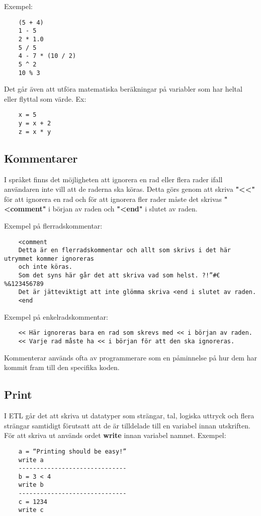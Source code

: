 \documentclass{TDP019mall}
\begin{document}
Exempel:

\begin{verbatim}
    (5 + 4)
    1 - 5
    2 * 1.0
    5 / 5
    4 - 7 * (10 / 2)
    5 ^ 2
    10 % 3
\end{verbatim}

Det går även att utföra matematiska beräkningar på variabler som har heltal eller flyttal som värde. Ex:
\begin{verbatim}
    x = 5
    y = x + 2
    z = x * y
\end{verbatim}

\subsection{Kommentarer}
I språket finns det möjligheten att ignorera en rad eller flera rader ifall användaren inte vill att de raderna ska köras. 
Detta görs genom att skriva \textbf{"<<"} för att ignorera en rad och för att ignorera fler rader måste det skrivas 
\textbf{"<comment"} i början av raden och \textbf{"<end"} i slutet av raden.

Exempel på flerradskommentar:
\begin{verbatim}
    <comment 
    Detta är en flerradskommentar och allt som skrivs i det här utrymmet kommer ignoreras 
    och inte köras. 
    Som det syns här går det att skriva vad som helst. ?!”#€%&123456789
    Det är jätteviktigt att inte glömma skriva <end i slutet av raden.
    <end
\end{verbatim}
 
Exempel på enkelradskommentar:
\begin{verbatim}
    << Här ignoreras bara en rad som skrevs med << i början av raden.
    << Varje rad måste ha << i början för att den ska ignoreras.
\end{verbatim}
 
Kommenterar används ofta av programmerare som en påminnelse på hur dem har kommit fram till den specifika koden.

\subsection{Print}
I ETL går det att skriva ut datatyper som strängar, tal, logiska uttryck och flera strängar samtidigt förutsatt att de är tilldelade till en variabel innan utskriften. 
För att skriva ut används ordet \textbf{write} innan variabel namnet. 
Exempel: 
 
\begin{verbatim}
    a = “Printing should be easy!”
    write a
    ------------------------------
    b = 3 < 4
    write b
    ------------------------------
    c = 1234
    write c
\end{verbatim}
 
\end{document}
